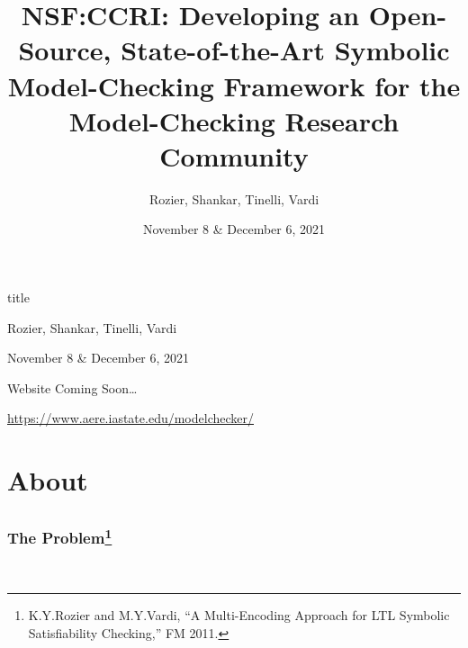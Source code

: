 \documentclass[dvipsnames,svgnames]{beamer}
\title[NSF:CCRI TAB Meeting]{NSF:CCRI: Developing an Open-Source, State-of-the-Art Symbolic Model-Checking Framework for the Model-Checking Research Community}
\author{Rozier, Shankar, Tinelli, Vardi}
\date{November 8 \& December 6, 2021}
\newcommand{\pspic}[2]{\scalebox{#1}{\texttt{[image: \#2]}}}
\begin{document}
\begin{frame}[fragile]  
  \huge
  \begin{center}
    \begin{beamercolorbox}[center]{title}

      \inserttitle

      \medskip
    \end{beamercolorbox}

    \normalsize
    
    \medskip
    {\large Rozier, Shankar, Tinelli, Vardi}
        \vspace{0.2in}

        \centerline{ }
        
     {\large November 8 \& December 6, 2021}

    \bigskip
 

\centerline{Website Coming Soon\ldots}
\centerline{\textcolor{red}{\url{ https://www.aere.iastate.edu/modelchecker/}}}
  \end{center}
\end{frame}


\section{About}
\subsection{ } %


\begin{frame}
\frametitle{The Problem\footnote{\tiny K.Y.Rozier and M.Y.Vardi, ``A Multi-Encoding Approach for LTL Symbolic Satisfiability Checking,'' FM 2011.}}

\vspace{-0.1in}
    \begin{center}
      \pspic{0.32}{figs/R2scaleableRunTime_logscale-eps-converted-to.pdf} \\

\normalsize
    \end{center}

\end{frame}
\end{document}
